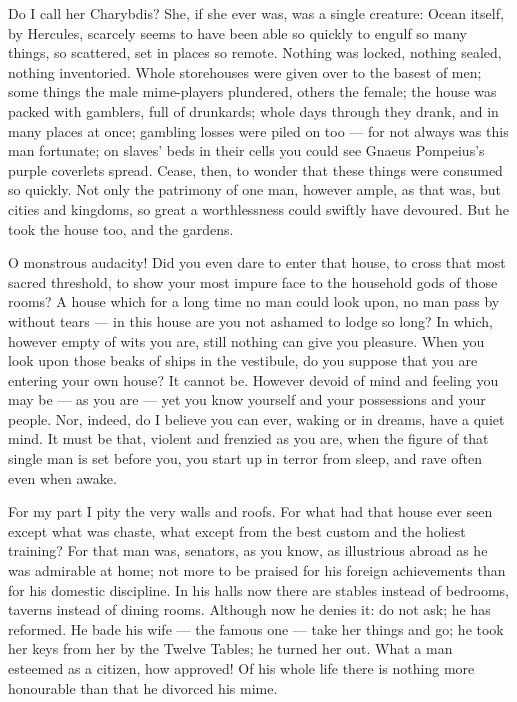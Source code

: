  Do I call her Charybdis? She, if she ever was, was a single creature: Ocean itself, by Hercules, scarcely seems to have been able so quickly to engulf so many things, so scattered, set in places so remote. Nothing was locked, nothing sealed, nothing inventoried. Whole storehouses were given over to the basest of men; some things the male mime-players plundered, others the female; the house was packed with gamblers, full of drunkards; whole days through they drank, and in many places at once; gambling losses were piled on too --- for not always was this man fortunate; on slaves' beds in their cells you could see Gnaeus Pompeius's purple coverlets spread. Cease, then, to wonder that these things were consumed so quickly. Not only the patrimony of one man, however ample, as that was, but cities and kingdoms, so great a worthlessness could swiftly have devoured. But he took the house too, and the gardens.

 O monstrous audacity! Did you even dare to enter that house, to cross that most sacred threshold, to show your most impure face to the household gods of those rooms? A house which for a long time no man could look upon, no man pass by without tears --- in this house are you not ashamed to lodge so long? In which, however empty of wits you are, still nothing can give you pleasure. When you look upon those beaks of ships in the vestibule, do you suppose that you are entering your own house? It cannot be. However devoid of mind and feeling you may be --- as you are --- yet you know yourself and your possessions and your people. Nor, indeed, do I believe you can ever, waking or in dreams, have a quiet mind. It must be that, violent and frenzied as you are, when the figure of that single man is set before you, you start up in terror from sleep, and rave often even when awake.

 For my part I pity the very walls and roofs. For what had that house ever seen except what was chaste, what except from the best custom and the holiest training? For that man was, senators, as you know, as illustrious abroad as he was admirable at home; not more to be praised for his foreign achievements than for his domestic discipline. In his halls now there are stables instead of bedrooms, taverns instead of dining rooms. Although now he denies it: do not ask; he has reformed. He bade his wife --- the famous one --- take her things and go; he took her keys from her by the Twelve Tables; he turned her out. What a man esteemed as a citizen, how approved! Of his whole life there is nothing more honourable than that he divorced his mime.


